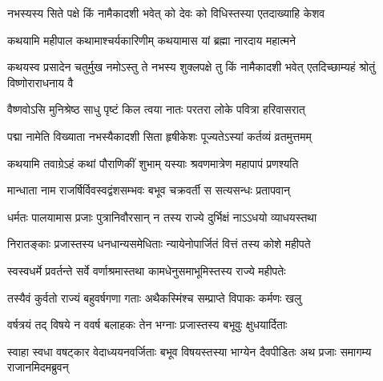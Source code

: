 \genMangalaShloka

\hyperref[sec:ekadashi_mahatmyam_padma_puranam]{\closesub}
\clearpage

\label{sec:padma-bhadrapada-shukla-padma}

\ganapatyadiDhyanam
\padmaPuranam



\twolineshloka
{नभस्यस्य सिते पक्षे किं नामैकादशी भवेत्}
{को देवः को विधिस्तस्या एतदाख्याहि केशव}%


\twolineshloka
{कथयामि महीपाल कथामाश्चर्यकारिणीम्}
{कथयामास यां ब्रह्मा नारदाय महात्मने}%


\threelineshloka
{कथयस्व प्रसादेन चतुर्मुख नमोऽस्तु ते}
{नभस्य शुक्लपक्षे तु किं नामैकादशी भवेत्}
{एतदिच्छाम्यहं श्रोतुं विष्णोराराधनाय वै}%


\twolineshloka
{वैष्णवोऽसि मुनिश्रेष्ठ साधु पृष्टं किल त्वया}
{नातः परतरा लोके पवित्रा हरिवासरात्}%

\twolineshloka
{पद्मा नामेति विख्याता नभस्यैकादशी सिता}
{हृषीकेशः पूज्यतेऽस्यां कर्तव्यं व्रतमुत्तमम्}%

\twolineshloka
{कथयामि तवाग्रेऽहं कथां पौराणिकीं शुभाम्}
{यस्याः श्रवणमात्रेण महापापं प्रणश्यति}%

\twolineshloka
{मान्धाता नाम राजर्षिर्विवस्वद्वंशसम्भवः}
{बभूव चक्रवर्ती स सत्यसन्धः प्रतापवान्}%

\twolineshloka
{धर्मतः पालयामास प्रजाः पुत्रानिवौरसान्}
{न तस्य राज्ये दुर्भिक्षं नाऽऽधयो व्याधयस्तथा}%

\twolineshloka
{निरातङ्काः प्रजास्तस्य धनधान्यसमेधिताः}
{न्यायेनोपार्जितं वित्तं तस्य कोशे महीपते}%

\twolineshloka
{स्वस्वधर्मे प्रवर्तन्ते सर्वे वर्णाश्रमास्तथा}
{कामधेनुसमाभूमिस्तस्य राज्ये महीपतेः}%

\twolineshloka
{तस्यैवं कुर्वतो राज्यं बहुवर्षगणा गताः}
{अथैकस्मिंश्च सम्प्राप्ते विपाकः कर्मणः खलु}%

\twolineshloka
{वर्षत्रयं तद् विषये न ववर्ष बलाहकः}
{तेन भग्नाः प्रजास्तस्य बभूवुः क्षुधयार्दिताः}%

\threelineshloka
{स्वाहा स्वधा वषट्कार वेदाध्ययनवर्जिताः}
{बभूव विषयस्तस्या भाग्येन दैवपीडितः}
{अथ प्रजाः समागम्य राजानमिदमब्रुवन्}%

